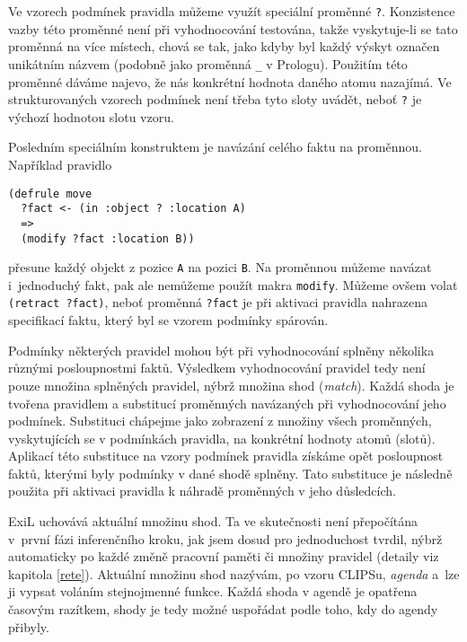 Ve vzorech podmínek pravidla můžeme využít speciální proměnné \verb|?|.
Konzistence vazby této proměnné není při vyhodnocování testována, takže
vyskytuje-li se tato proměnná na více místech, chová se tak, jako kdyby byl
každý výskyt označen unikátním názvem (podobně jako proměnná \verb|_| v
Prologu). Použitím této proměnné dáváme najevo, že nás konkrétní hodnota daného
atomu nazajímá. Ve strukturovaných vzorech podmínek není třeba tyto sloty uvádět,
neboť \verb|?| je výchozí hodnotou slotu vzoru.

Posledním speciálním konstruktem je navázání celého faktu na proměnnou.
Například pravidlo
\begin{verbatim}
(defrule move
  ?fact <- (in :object ? :location A)
  =>
  (modify ?fact :location B))
\end{verbatim}
přesune každý objekt z pozice \verb|A| na pozici \verb|B|. Na proměnnou
můžeme navázat i~jednoduchý fakt, pak ale nemůžeme použít makra \verb|modify|.
Můžeme ovšem volat \verb|(retract ?fact)|, neboť proměnná \verb|?fact| je při
aktivaci pravidla nahrazena specifikací faktu, který byl se vzorem podmínky
spárován.

Podmínky některých pravidel mohou být při vyhodnocování splněny několika různými
posloupnostmi faktů. Výsledkem vyhodnocování pravidel tedy není pouze množina
splněných pravidel, nýbrž množina shod (\emph{match}). Každá shoda je tvořena
pravidlem a substitucí proměnných navázaných při vyhodnocování jeho podmínek.
Substituci chápejme jako zobrazení z množiny všech proměnných, vyskytujících se
v podmínkách pravidla, na konkrétní hodnoty atomů (slotů). Aplikací této
substituce na vzory podmínek pravidla získáme opět posloupnost faktů, kterými
byly podmínky v dané shodě splněny. Tato substituce je následně použita při
aktivaci pravidla k náhradě proměnných v jeho důsledcích.

ExiL uchovává aktuální množinu shod. Ta ve skutečnosti není přepočítána v~první
fázi inferenčního kroku, jak jsem dosud pro jednoduchost tvrdil, nýbrž
automaticky po každé změně pracovní paměti či množiny pravidel (detaily viz
kapitola \ref{rete}). Aktuální množinu shod nazývám, po vzoru CLIPSu,
\emph{agenda} a~lze ji vypsat voláním stejnojmenné funkce. Každá shoda v agendě
je opatřena časovým razítkem, shody je tedy možné uspořádat podle toho, kdy do
agendy přibyly.

